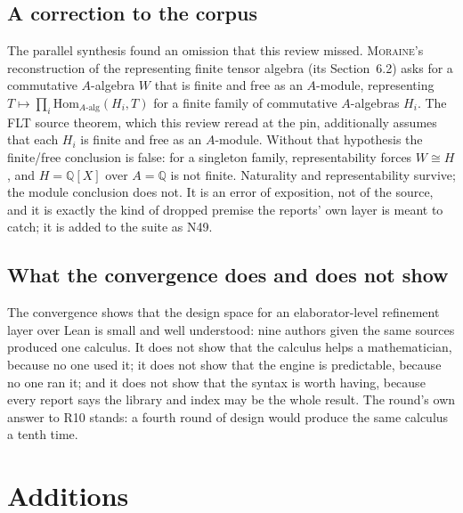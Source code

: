 \documentclass[11pt,a4paper]{article}
\newcommand{\Mr}{\textsc{Moraine}}
\newcommand{\Q}{\mathbb Q}
\theoremstyle{definition}
\begin{document}
\subsection{A correction to the corpus}\label{sec:corpus-correction}
The parallel synthesis found an omission that this review missed. \Mr's reconstruction of the representing finite tensor algebra (its Section~6.2) asks for a commutative $A$-algebra $W$ that is finite and free as an $A$-module, representing $T\mapsto\prod_i\mathrm{Hom}_{A\text{-alg}}(H_i,T)$ for a finite family of commutative $A$-algebras $H_i$. The FLT source theorem, which this review reread at the pin, additionally assumes that each $H_i$ is finite and free as an $A$-module. Without that hypothesis the finite/free conclusion is false: for a singleton family, representability forces $W\cong H$, and $H=\Q[X]$ over $A=\Q$ is not finite. Naturality and representability survive; the module conclusion does not. It is an error of exposition, not of the source, and it is exactly the kind of dropped premise the reports' own layer is meant to catch; it is added to the suite as N49.

\subsection{What the convergence does and does not show}
The convergence shows that the design space for an elaborator-level refinement layer over Lean is small and well understood: nine authors given the same sources produced one calculus. It does not show that the calculus helps a mathematician, because no one used it; it does not show that the engine is predictable, because no one ran it; and it does not show that the syntax is worth having, because every report says the library and index may be the whole result. The round's own answer to R10 stands: a fourth round of design would produce the same calculus a tenth time.

\section{Additions}\label{sec:additions}
\end{document}
